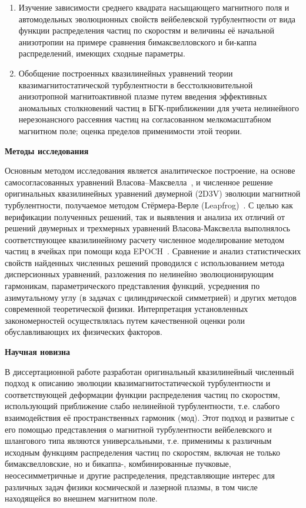 \begin{enumerate}
    \item Изучение зависимости среднего квадрата насыщающего магнитного поля и автомодельных эволюционных свойств вейбелевской турбулентности от вида функции распределения частиц по скоростям и величины её начальной анизотропии на примере сравнения бимаксвелловского и би-каппа распределений, имеющих сходные параметры.
    
    \item Обобщение построенных квазилинейных уравнений теории квазимагнитостатической турбулентности в бесстолкновительной анизотропной магнитоактивной плазме путем введения эффективных аномальных столкновений частиц в БГК-приближении для учета нелинейного нерезонансного рассеяния частиц на согласованном мелкомасштабном магнитном поле; оценка пределов применимости этой теории.

\end{enumerate}

{\bfseries Методы исследования}

Основным методом исследования является аналитическое построение, на основе самосогласованных уравнений Власова–Максвелла~\cite{Vlasov1967,Kocharovsky2016}, и численное решение оригинальных квазилинейных уравнений двумерной (2D3V) эволюции магнитной турбулентности, получаемое методом Стёрмера-Верле (Leapfrog)~\cite{Birdsall2018}. С целью как верификации полученных решений, так и выявления и анализа их отличий от решений двумерных и трехмерных уравнений Власова-Максвелла выполнялось соответствующее квазилинейному расчету численное моделирование методом частиц в ячейках при помощи кода EPOCH~\cite{Arber2015}. Сравнение и анализ статистических свойств найденных численных решений проводился с использованием метода дисперсионных уравнений, разложения по нелинейно эволюционирующим гармоникам, параметрического представления функций, усреднения по азимутальному углу (в задачах с цилиндрической симметрией) и других методов современной теоретической физики. Интерпретация установленных закономерностей осуществлялась путем качественной оценки роли обуславливающих их физических факторов.

{\bfseries Научная новизна}

В диссертационной работе разработан оригинальный квазилинейный численный подход к описанию эволюции квазимагнитостатической турбулентности и соответствующей деформации функции распределения частиц по скоростям, использующий приближение слабо нелинейной турбулентности, т.е. слабого взаимодействия её пространственных гармоник (мод). Этот подход и развитые с его помощью представления о магнитной турбулентности вейбелевского и шлангового типа являются универсальными, т.е. применимы к различным исходным функциям распределения частиц по скоростям, включая не только бимаксвелловские, но и бикаппа-, комбинированные пучковые, неосесимметричные и другие распределения, представляющие интерес для различных задач физики космической и лазерной плазмы, в том числе находящейся во внешнем магнитном поле.

